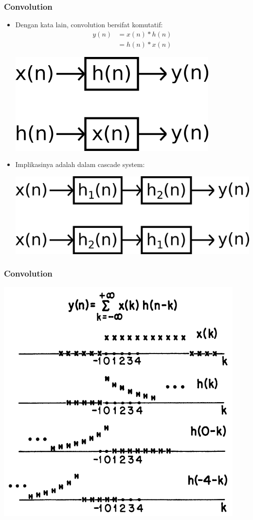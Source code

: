 \documentclass[pdflatex,compress]{beamer}
\begin{document}
\begin{frame}
	\frametitle{Convolution}
	\begin{itemize}
		\item Dengan kata lain, convolution bersifat komutatif:
		\begin{align*}
			y(n) &= x(n) * h(n) \\
			&= h(n) * x(n)
		\end{align*}
		\begin{center}
			\includegraphics[width=0.3\linewidth]{img/img014}
		\end{center}
		\item Implikasinya adalah dalam cascade system:
		\begin{center}
			\includegraphics[width=0.4\linewidth]{img/img015}
		\end{center}
	\end{itemize}
\end{frame}

\begin{frame}
	\frametitle{Convolution}
	\begin{center}
		\includegraphics[height=0.8\textheight]{img/img016}
	\end{center}
\end{frame}
\end{document}
